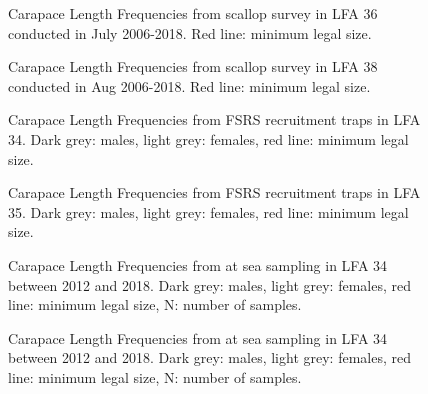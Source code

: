 \documentclass[11pt]{article}
\newcommand{\e}{/SpinDr/backup/bio_data/bio.lobster/figures/LFA3438Framework2019/} %
\begin{document}
    \begin{figure}
    \centering
        \caption{Carapace Length Frequencies from scallop survey in LFA 36 conducted in July 2006-2018. Red line: minimum legal size.}

    \end{figure}



    \begin{figure}
    \centering
        \caption{Carapace Length Frequencies from scallop survey in LFA 38 conducted in Aug 2006-2018. Red line: minimum legal size.}

    \end{figure}




    \begin{figure}
    \centering
        \caption{Carapace Length Frequencies from FSRS recruitment traps in LFA 34. Dark grey: males, light grey: females, red line: minimum legal size.}

    \end{figure}


    \begin{figure}
    \centering
        \caption{Carapace Length Frequencies from FSRS recruitment traps in LFA 35. Dark grey: males, light grey: females, red line: minimum legal size.}

    \end{figure}



   \begin{figure}
    \centering
        \caption{Carapace Length Frequencies from at sea sampling in LFA 34 between 2012 and 2018. Dark grey: males, light grey: females, red line: minimum legal size, N: number of samples.}

    \end{figure}

   \begin{figure}
    \centering
        \caption{Carapace Length Frequencies from at sea sampling in LFA 34 between 2012 and 2018. Dark grey: males, light grey: females, red line: minimum legal size, N: number of samples.}

    \end{figure}
\end{document}
